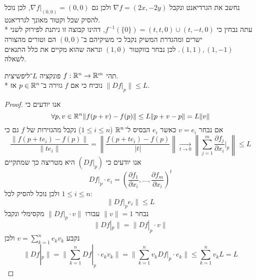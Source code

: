נחשב את הגרדיאנט ונקבל $\nabla f = (2x, -2y)$ ולכן גם $\nabla f |_{(0, 0)} = (0, 0)$, לכן נוכל להסיק שכל וקטור מאונך לגרדיאנט. \\*
עתה נבחין כי $f^{-1}(\{0\}) = (t, t, 0) \cup (t, -t, 0)$, דהינו קבוצה זו ניתנת לפירוק לשני ישרים ומהגדרת המשיק נקבל כי משיקיהם ב־$(0, 0)$ הם וטורים מהצורה $(1, 1), (1, -1)$.
לכן נבחר בווקטור $(1, 0)$ ונראה שהוא מקיים את כלל התנאים לשאלה.

\Question{}
תהי $f : \mathbb{R}^n \to \mathbb{R}^m$ פונקציה $L$־ליפשיצית. \\*
נוכיח כי אם $f$ גזירה ב־$p \in \mathbb{R}^n$ אז $\lVert Df |_p \rVert \le L$.
\begin{proof}
	אנו יודעים כי
	\[
		\forall p, v \in \mathbb{R}^n \lVert f(p + v) - f(p) \rVert \le L \lVert p + v - p \rVert = L \lVert v \rVert
	\]
	אם נבחר $v = e_i$ כאשר $e_i$ הבסיס ל־$\mathbb{R}^n$ ($1 \le i \le n$) נקבל מהגזירות של $f$ גם כי
	\[
		\frac{\lVert f(p + te_i) - f(p) \rVert}{\lVert te_i \rVert}
		= \left\lVert \frac{f(p + te_i) - f(p)}{|t|} \right\rVert
		\xrightarrow[t \to 0]{}
		\left\lVert \sum_{j = 1}^{m} \frac{\partial f_j}{\partial x_i}|_p \right\rVert
		\le L
	\]
	אנו יודעים כי $(Df|_p)$ היא מטריצה כך שמתקיים
	\[
		Df|_p \cdot e_i = {(\frac{\partial f_1}{\partial x_i}, \dots, \frac{\partial f_m}{\partial x_i})}^t
	\]
	ולכן נוכל להסיק לכל $1 \le i \le n$:
	\[
		\lVert Df|_p e_i \rVert \le L
	\]
	נבחר $\lVert v \rVert = 1$ עבורו $\lVert Df |_p \cdot v \rVert$ מקסימלי ונקבל
	\[
		\lVert Df |_p \rVert = \lVert Df|_p \cdot v \rVert
	\]
	נקבע $v = \sum_{k = 1}^{n} e_k v_k$ ולכן
	\[
		\lVert Df |_p \rVert
		= \lVert \sum_{k = 1}^{n} Df|_p \cdot e_k v_k \rVert
		= \lVert \sum_{k = 1}^{n} v_k Df|_p \cdot e_k \rVert
		\le \sum_{k = 1}^{n} v_k L
		= L
	\]
\end{proof}


